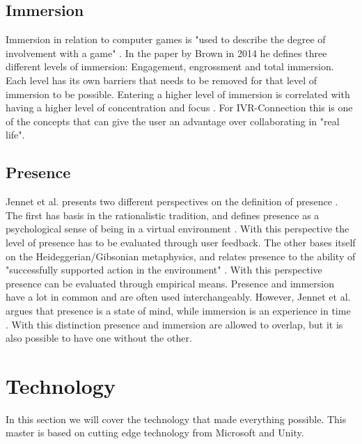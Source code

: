         \subsection{Immersion} %
            Immersion in relation to computer games is "used to describe the degree of involvement with a game" \cite{Brown2004}. In the paper by Brown in 2014 he defines three different levels of immersion: Engagement, engrossment and total immersion. Each level has its own barriers that needs to be removed for that level of immersion to be possible. Entering a higher level of immersion is correlated with having a higher level of concentration and focus \cite{Jennett2008}. For IVR-Connection this is one of the concepts that can give the user an advantage over collaborating in "real life".
        
        \subsection{Presence} %
            Jennet et al. presents two different perspectives on the definition of presence \cite{Jennett2008}. The first has basis in the rationalistic tradition, and defines presence as a psychological sense of being in a virtual environment \cite{Slater1994}. With this perspective the level of presence has to be evaluated through user feedback. The other bases itself on the Heideggerian/Gibsonian metaphysics, and relates presence to the ability of "successfully supported action in the environment" \cite{Zahorik1998}. With this perspective presence can be evaluated through empirical means. Presence and immersion have a lot in common and are often used interchangeably. However, Jennet et al. argues that presence is a state of mind, while immersion is an experience in time \cite{Jennett2008}. With this distinction presence and immersion are allowed to overlap, but it is also possible to have one without the other.
            
    
    \section{Technology}
        In this section we will cover the technology that made everything possible. This master is based on cutting edge technology from Microsoft and Unity.
    
